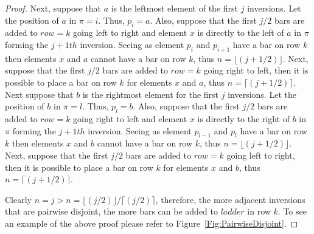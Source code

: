 \begin{proof}
    Next, suppose that $a$ is  the leftmost element of the first $j$ inversions. Let the position of $a$ in $\pi=i$. 
    Thus, $p_{i}=a$.  
    Also, suppose that the first $j/2$ bars are added to $row=k$ going left to right and element $x$ is directly to the left of $a$ 
    in $\pi$ forming  the $j+1th$ inversion. 
    Seeing as element $p_{i}$ and $p_{i+1}$ have a bar on row $k$ then elements $x$ and $a$ cannot have a bar on row $k$, 
    thus $n=\lfloor(j+1/2)\rfloor$. Next, suppose that the first $j/2$ bars are added to $row=k$ going right to left, then it is possible to place a 
    bar on row $k$ for elements $x$ and $a$, thus $n=\lceil(j+1/2)\rceil$. Next suppose that $b$ is the rightmost element for the first 
    $j$ inversions. Let the position of $b$ in $\pi=l$. Thus, $p_{l}=b$. Also, suppose that the first $j/2$ bars are added to 
    $row=k$ going right to left and element $x$ is directly to the right of $b$ in $\pi$ forming the $j+1th$ inversion.
    Seeing as element $p_{l-1}$ and $p_{l}$ have a bar on row $k$ then elements $x$ and $b$ cannot have a bar on row $k$, 
    thus $n=\lfloor(j+1/2)\rfloor$.
    Next, suppose that the first $j/2$ bars are added to $row=k$ going left to right, then it is possible to place a 
    bar on row $k$ for elements $x$ and $b$, thus $n=\lceil(j+1/2)\rceil$.

    Clearly $n=j>n=\lfloor(j/2)\rfloor/\lceil(j/2)\rceil$, therefore, the more adjacent inversions that are pairwise disjoint, the more bars 
    can be added to $ladder$ in row $k$.
    To see an example of the above proof please refer to Figure~\ref{Fig:PairwiseDisjoint}.

\end{proof}\pagebreak


